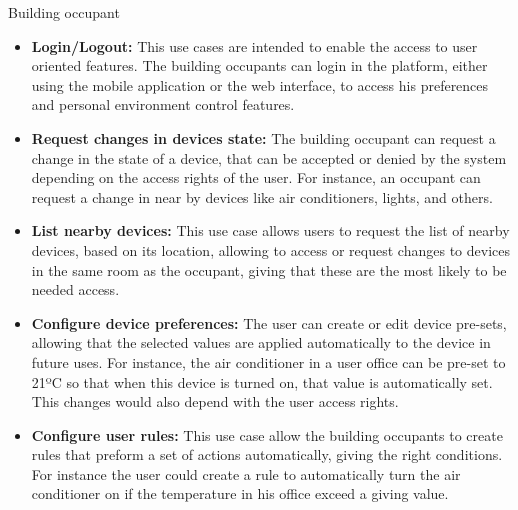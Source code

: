 \begin{Paragraph}{Building occupant}
\begin{itemize}
	\item{\textbf{Login/Logout:}	This use cases are intended to enable the access to user oriented features. The building occupants can login in the platform, either using the mobile application or the web interface, to access his preferences and personal environment control features.}
	\item{\textbf{Request changes in devices state:}	The building occupant can request a change in the state of a device, that can be accepted or denied by the system depending on the access rights of the user. For instance, an occupant can request a change in near by devices like  air conditioners, lights, and others.}
	\item{\textbf{List nearby devices:}	This use case allows users to request the list of nearby devices, based on its location, allowing to access or request changes to devices in the same room as the occupant, giving that these are the most likely to be needed access.}
	\item{\textbf{Configure device preferences:}	The user can create or edit device pre-sets, allowing that the selected values are applied automatically to the device in future uses. For instance, the air conditioner in a user office can be pre-set to 21ºC so that when this device is turned on, that value is automatically set. This changes would also depend with the user access rights.}
	\item{\textbf{Configure user rules:}	This use case allow the building occupants to create rules that preform a set of actions automatically, giving the right conditions. For instance the user could create a rule to automatically turn the air conditioner on if the temperature in his office exceed a giving value.} 

\end{itemize}
\end{Paragraph}


